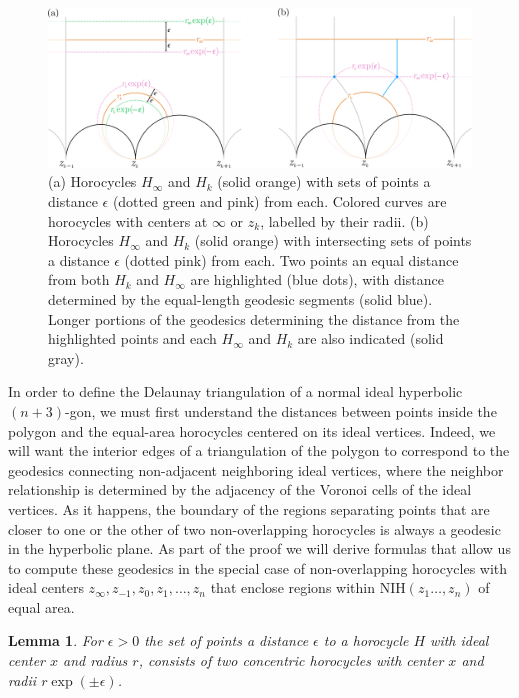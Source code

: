 \documentclass[10pt,a4paper]{article}
\newtheorem{lemma}{Lemma}
\begin{document}
 \begin{figure}
     \centering
     \includegraphics[width=1.0\textwidth]{concentric_horocycles.pdf}
     \caption{(a) Horocycles $H_{\infty}$ and $H_{k}$ (solid orange) with sets of points a distance $\epsilon$ (dotted green and pink) from each.  Colored curves are horocycles with centers at $\infty$ or $z_k$, labelled by their radii. (b) Horocycles $H_{\infty}$ and $H_{k}$ (solid orange) with intersecting sets of points a distance $\epsilon$ (dotted pink) from each. Two points an equal distance from both $H_{k}$ and $H_{\infty}$ are highlighted (blue dots), with distance determined by the equal-length geodesic segments (solid blue). Longer portions of the geodesics determining the distance from the highlighted points and each $H_{\infty}$ and $H_{k}$ are also indicated (solid gray).}
     \label{fig:concentric_horocycles}
 \end{figure}

 In order to define the Delaunay triangulation of a normal ideal hyperbolic $(n+3)$-gon, we must first understand the distances between points inside the polygon and the equal-area horocycles centered on its ideal vertices. Indeed, we will want the interior edges of a triangulation of the polygon to correspond to the geodesics connecting non-adjacent neighboring ideal vertices, where the neighbor relationship is determined by the adjacency of the Voronoi cells of the ideal vertices. As it happens, the boundary of the regions separating points that are closer to one or the other of two non-overlapping horocycles is always a geodesic in the hyperbolic plane.  As part of the proof we will derive formulas that allow us to compute these geodesics in the special case of non-overlapping horocycles with ideal centers $z_{\infty}, z_{-1}, z_0, z_1, \ldots, z_n$ that enclose regions within $\text{NIH}(z_1\ldots, z_n)$ of equal area.

 \begin{lemma}
 For $\epsilon > 0$ the set of points a distance $\epsilon$ to a horocycle $H$ with ideal center $x$ and radius $r$, consists of two concentric horocycles with center $x$ and radii $r \exp(\pm \epsilon)$.
 \label{lem:equidist2horo}
 \end{lemma}
\end{document}
